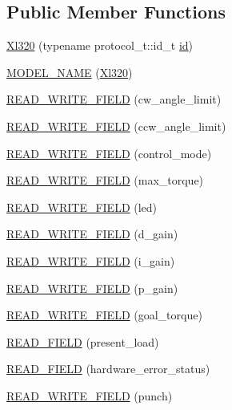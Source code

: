 \subsection*{Public Member Functions}
\begin{DoxyCompactItemize}
\item 
\hyperlink{classdynamixel_1_1servos_1_1_xl320_aed4a5f824f79553734f961190da8c4ef}{Xl320} (typename protocol\+\_\+t\+::id\+\_\+t \hyperlink{classdynamixel_1_1servos_1_1_servo_a2d022081672e25a7bb57b76706e1cc57}{id})
\item 
\hyperlink{classdynamixel_1_1servos_1_1_xl320_a5fc3d58cf15be05cb76bfc9a6de213b7}{M\+O\+D\+E\+L\+\_\+\+N\+A\+ME} (\hyperlink{classdynamixel_1_1servos_1_1_xl320}{Xl320})
\item 
\hyperlink{classdynamixel_1_1servos_1_1_xl320_a65c59a74ce3a8f8371b1961d36a4efb8}{R\+E\+A\+D\+\_\+\+W\+R\+I\+T\+E\+\_\+\+F\+I\+E\+LD} (cw\+\_\+angle\+\_\+limit)
\item 
\hyperlink{classdynamixel_1_1servos_1_1_xl320_a0f71945ee31bd8bc839fa7ffe8276dbe}{R\+E\+A\+D\+\_\+\+W\+R\+I\+T\+E\+\_\+\+F\+I\+E\+LD} (ccw\+\_\+angle\+\_\+limit)
\item 
\hyperlink{classdynamixel_1_1servos_1_1_xl320_af2869bfbfad26138c4f105ce13af20e0}{R\+E\+A\+D\+\_\+\+W\+R\+I\+T\+E\+\_\+\+F\+I\+E\+LD} (control\+\_\+mode)
\item 
\hyperlink{classdynamixel_1_1servos_1_1_xl320_a4631cc8b5dcb7f379d73208a1ff333e7}{R\+E\+A\+D\+\_\+\+W\+R\+I\+T\+E\+\_\+\+F\+I\+E\+LD} (max\+\_\+torque)
\item 
\hyperlink{classdynamixel_1_1servos_1_1_xl320_a29edd31754c9d5e907cc970e69ab0e49}{R\+E\+A\+D\+\_\+\+W\+R\+I\+T\+E\+\_\+\+F\+I\+E\+LD} (led)
\item 
\hyperlink{classdynamixel_1_1servos_1_1_xl320_a1f26c93c37f80f3aca9b03447750f24d}{R\+E\+A\+D\+\_\+\+W\+R\+I\+T\+E\+\_\+\+F\+I\+E\+LD} (d\+\_\+gain)
\item 
\hyperlink{classdynamixel_1_1servos_1_1_xl320_a2a6ceb05caf8844bcb268ed4966811cb}{R\+E\+A\+D\+\_\+\+W\+R\+I\+T\+E\+\_\+\+F\+I\+E\+LD} (i\+\_\+gain)
\item 
\hyperlink{classdynamixel_1_1servos_1_1_xl320_a8a084c05e6da3f600a2911667cc45516}{R\+E\+A\+D\+\_\+\+W\+R\+I\+T\+E\+\_\+\+F\+I\+E\+LD} (p\+\_\+gain)
\item 
\hyperlink{classdynamixel_1_1servos_1_1_xl320_a8fd338fa56bc4574ba9bb1a95518e6b0}{R\+E\+A\+D\+\_\+\+W\+R\+I\+T\+E\+\_\+\+F\+I\+E\+LD} (goal\+\_\+torque)
\item 
\hyperlink{classdynamixel_1_1servos_1_1_xl320_aa2fd6f7c894b40f2afbe8d3705f5b840}{R\+E\+A\+D\+\_\+\+F\+I\+E\+LD} (present\+\_\+load)
\item 
\hyperlink{classdynamixel_1_1servos_1_1_xl320_a5f2bac4373d63023fb339aaeb098ac54}{R\+E\+A\+D\+\_\+\+F\+I\+E\+LD} (hardware\+\_\+error\+\_\+status)
\item 
\hyperlink{classdynamixel_1_1servos_1_1_xl320_aec1bb28ccb7a84abc644903314e898d9}{R\+E\+A\+D\+\_\+\+W\+R\+I\+T\+E\+\_\+\+F\+I\+E\+LD} (punch)
\end{DoxyCompactItemize}
